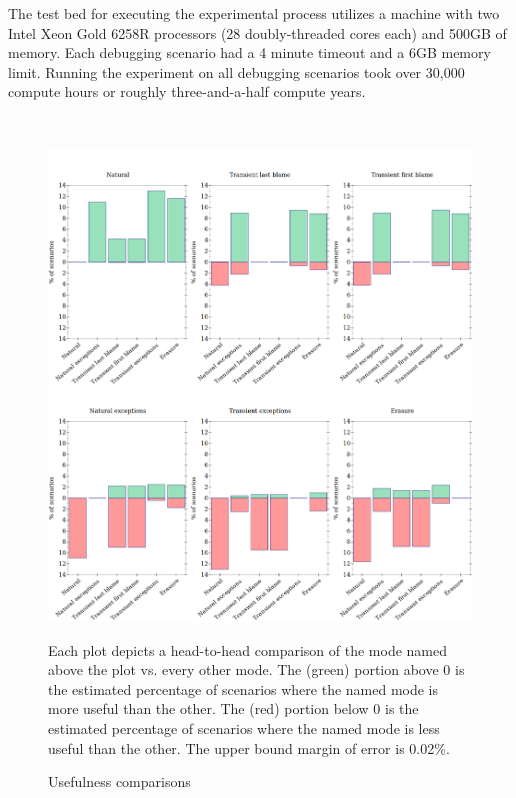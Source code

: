

The test bed for executing the experimental process utilizes a machine with two
Intel Xeon Gold 6258R processors (28 doubly-threaded cores each) and 500GB of
memory.  Each debugging scenario had a 4 minute timeout and a 6GB memory
limit. Running the experiment on all debugging scenarios took over
30,000 compute hours or roughly three-and-a-half compute years. 

\
\begin{figure} \footnotesize 
  \centering
  \includegraphics[width=\textwidth]{./plots/avo-bars}

  \vspace{1em}
  \begin{minipage}{0.95\textwidth}
      Each plot depicts a head-to-head comparison of the mode named above the
      plot vs. every other mode.  The (green) portion above 0 is the estimated
      percentage of scenarios where the named mode is more useful than the
      other.  The (red) portion below 0 is the estimated percentage of scenarios
      where the named mode is less useful than the other.  The upper bound
      margin of error is 0.02\%.
  \end{minipage}

  \caption{Usefulness comparisons}
  \label{fig:avo-bars}
\end{figure}

